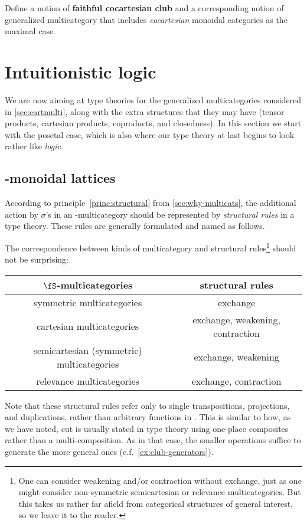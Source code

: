 \documentclass{book}
\let\types\vdash
\begin{document}
\begin{ex}\label{ex:cocartesian-clubs}
  Define a notion of \textbf{faithful cocartesian club} and a corresponding notion of generalized multicategory that includes \emph{cocartesian} monoidal categories as the maximal case.
\end{ex}


\section{Intuitionistic logic}
\label{sec:logic}

We are now aiming at type theories for the generalized multicategories considered in \cref{sec:cartmulti}, along with the extra structures that they may have (tensor products, cartesian products, coproducts, and closedness).
In this section we start with the posetal case, which is also where our type theory at last begins to look rather like \emph{logic}.

\subsection{\fS-monoidal lattices}
\label{sec:monoidal-lattices}

According to principle~\eqref{princ:structural} from \cref{sec:why-multicats}, the additional action by $\sigma$'s in an \fS-multicategory should be represented by \emph{structural rules} in a type theory.
These rules are generally formulated and named as follows.
The correspondence between kinds of multicategory and structural rules\footnote{One can consider weakening and/or contraction without exchange, just as one might consider non-symmetric semicartesian or relevance multicategories.
  But this takes us rather far afield from categorical structures of general interest, so we leave it to the reader.} should not be surprising:
\begin{center}
\begin{tabular}{c|c}
  $\fS$-multicategories & structural rules\\\hline
  {symmetric multicategories} & exchange\\
  {cartesian multicategories} & exchange, weakening, contraction\\
  {semicartesian (symmetric) multicategories} & exchange, weakening\\
  {relevance multicategories} & exchange, contraction
\end{tabular}
\end{center}
Note that these structural rules refer only to single transpositions, projections, and duplications, rather than arbitrary functions in \fS.
This is similar to how, as we have noted, cut is usually stated in type theory using one-place composites rather than a multi-composition.
As in that case, the smaller operations suffice to generate the more general ones (c.f.\ \cref{ex:club-generators}).
\end{document}
